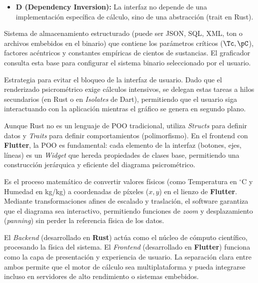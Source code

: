 \begin{description}
\begin{itemize}
                \item \textbf{D (Dependency Inversion):} La interfaz no depende de una implementación específica de cálculo, sino de una abstracción (trait en Rust).
            \end{itemize}
        \item[Bases de Datos:] Sistema de almacenamiento estructurado (puede ser JSON, SQL, XML, ton o archivos embebidos en el binario) que contiene los parámetros críticos ($\Tc, \pC$), factores acéntricos y constantes empíricas de cientos de sustancias. El graficador consulta esta base para configurar el sistema binario seleccionado por el usuario.
        \item[Patrón de Diseño "Worker" o Isolate:] Estrategia para evitar el bloqueo de la interfaz de usuario. Dado que el renderizado psicrométrico exige cálculos intensivos, se delegan estas tareas a hilos secundarios (en Rust o en \textit{Isolates} de Dart), permitiendo que el usuario siga interactuando con la aplicación mientras el gráfico se genera en segundo plano.
        \item[Programación Orientada a Objetos (POO) y Composición:] Aunque Rust no es un lenguaje de POO tradicional, utiliza \textit{Structs} para definir datos y \textit{Traits} para definir comportamientos (polimorfismo). En el frontend con \textbf{Flutter}, la POO es fundamental: cada elemento de la interfaz (botones, ejes, líneas) es un \textit{Widget} que hereda propiedades de clases base, permitiendo una construcción jerárquica y eficiente del diagrama psicrométrico.
        \item[Mapeo de Coordenadas (Transformación Afín):] Es el proceso matemático de convertir valores físicos (como Temperatura en $^\circ$C y Humedad en kg/kg) a coordenadas de píxeles ($x, y$) en el lienzo de \textbf{Flutter}. Mediante transformaciones afines de escalado y traslación, el software garantiza que el diagrama sea interactivo, permitiendo funciones de \textit{zoom} y desplazamiento (\textit{panning}) sin perder la referencia física de los datos.
        \item[Backend y Frontend:] El \textit{Backend} (desarrollado en \textbf{Rust}) actúa como el núcleo de cómputo científico, procesando la física del sistema. El \textit{Frontend} (desarrollado en \textbf{Flutter}) funciona como la capa de presentación y experiencia de usuario. La separación clara entre ambos permite que el motor de cálculo sea multiplataforma y pueda integrarse incluso en servidores de alto rendimiento o sistemas embebidos.

\end{description}
